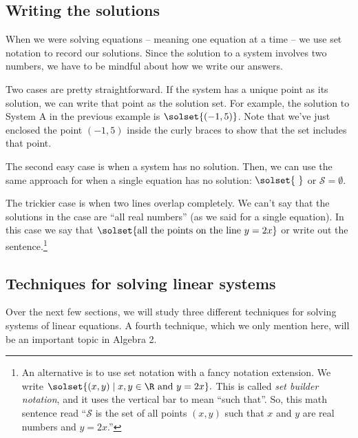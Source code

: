 \subsection{Writing the solutions}

When we were solving equations -- meaning one equation at a time -- we use set notation to record our solutions. Since the solution to a system involves two numbers, we have to be mindful about how we write our answers.

Two cases are pretty straightforward. If the system has a unique point as its solution, we can write that point as the solution set. For example, the solution to System A in the previous example is $\solset{(-1,5)}$. Note that we've just enclosed the point $(-1,5)$ inside the curly braces to show that the set includes that point.

The second easy case is when a system has no solution. Then, we can use the same approach for when a single equation has no solution: $\solset{~}$ or $\mathcal{S}=\emptyset$.

The trickier case is when two lines overlap completely. We can't say that the solutions in the case are ``all real numbers'' (as we said for a single equation). In this case we say that $\solset{\text{all the points on the line }y=2x}$ or write out the sentence.\footnote{An alternative is to use set notation with a fancy notation extension. We write $\solset{(x,y) \mid x, y \in \R \text{ and } y=2x}.$ This is called \textit{set builder notation}, and it uses the vertical bar to mean ``such that''. So, this math sentence read ``$\mathcal{S}$ is the set of all points $(x,y)$ such that $x$ and $y$ are real numbers and $y=2x$.''}


\subsection{Techniques for solving linear systems}

Over the next few sections, we will study three different techniques for solving systems of linear equations. A fourth technique, which we only mention here, will be an important topic in Algebra 2.

